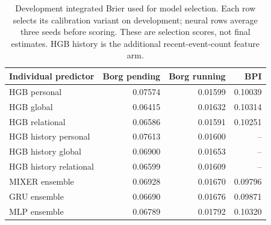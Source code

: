 \begin{table}[t]
\centering\small
\caption{Development integrated Brier used for model selection. Each row selects its calibration variant on development; neural rows average three seeds before scoring. These are selection scores, not final estimates. HGB history is the additional recent-event-count feature arm.}\label{tab:marginal}
\begin{tabular}{lrrr}
\toprule
Individual predictor & Borg pending & Borg running & BPI \\
\midrule
HGB personal & 0.07574 & 0.01599 & 0.10039 \\
HGB global & 0.06415 & 0.01632 & 0.10314 \\
HGB relational & 0.06586 & 0.01591 & 0.10251 \\
HGB history personal & 0.07613 & 0.01600 & -- \\
HGB history global & 0.06900 & 0.01653 & -- \\
HGB history relational & 0.06599 & 0.01609 & -- \\
MIXER ensemble & 0.06928 & 0.01670 & 0.09796 \\
GRU ensemble & 0.06690 & 0.01676 & 0.09871 \\
MLP ensemble & 0.06789 & 0.01792 & 0.10320 \\
\bottomrule
\end{tabular}
\end{table}
